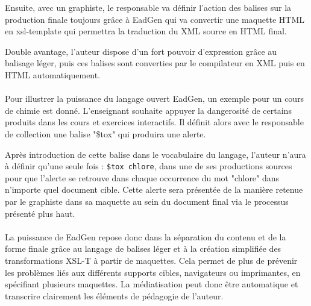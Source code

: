 Ensuite, avec un graphiste, le responsable va définir l'action des balises sur la production finale toujours grâce à EadGen qui va convertir une maquette HTML en xsl-template qui permettra la traduction du XML source en HTML final.

Double avantage, l'auteur dispose d'un fort pouvoir d'expression grâce au balisage léger, puis ces balises sont converties par le compilateur en XML puis en HTML automatiquement.

\paragraph{}
Pour illustrer la puissance du langage ouvert EadGen, un exemple pour un cours de chimie est donné. L'enseignant souhaite appuyer la dangerosité de certains produits dans les cours et exercices interactifs. Il définit alors avec le responsable de collection une balise "\$tox" qui produira une alerte.

Après introduction de cette balise dans le vocabulaire du langage, l'auteur n'aura à définir qu'une seule fois : \texttt{\$tox chlore}, dans une de ses productions sources pour que l'alerte se retrouve dans chaque occurrence du mot "chlore" dans n'importe quel document cible. Cette alerte sera présentée de la manière retenue par le graphiste dans sa maquette au sein du document final via le processus présenté plus haut.

\paragraph{}
La puissance de EadGen repose donc dans la séparation du contenu et de la forme finale grâce au langage de balises léger et à la création simplifiée des transformations XSL-T à partir de maquettes. Cela permet de plus de prévenir les problèmes liés aux différents supports cibles, navigateurs ou imprimantes, en spécifiant plusieurs maquettes. La médiatisation peut donc être automatique et transcrire clairement les éléments de pédagogie de l'auteur.